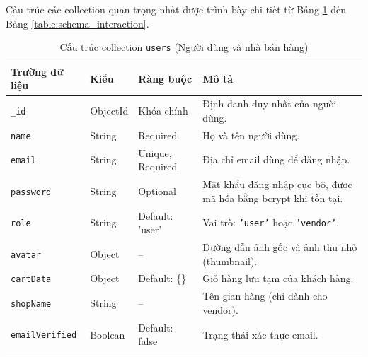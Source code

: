 \documentclass[../DoAn.tex]{subfiles}
\begin{document}
Cấu trúc các collection quan trọng nhất được trình bày chi tiết từ Bảng \ref{table:schema_user} đến Bảng \ref{table:schema_interaction}.

\begin{table}[H]
    \centering
    \caption{Cấu trúc collection \texttt{users} (Người dùng và nhà bán hàng)}
    \label{table:schema_user}
    \small
    \setlength{\tabcolsep}{3pt}
    \begin{tabular}{|>{\raggedright\arraybackslash}p{3.0cm}|>{\raggedright\arraybackslash}p{1.7cm}|>{\raggedright\arraybackslash}p{2.6cm}|>{\raggedright\arraybackslash}p{5.3cm}|}
        \hline
        \textbf{Trường dữ liệu} & \textbf{Kiểu} & \textbf{Ràng buộc} & \textbf{Mô tả} \\ \hline
        \texttt{\_id} & ObjectId & Khóa chính & Định danh duy nhất của người dùng. \\ \hline
        \texttt{name} & String & Required & Họ và tên người dùng. \\ \hline
        \texttt{email} & String & Unique, Required & Địa chỉ email dùng để đăng nhập. \\ \hline
        \texttt{password} & String & Optional & Mật khẩu đăng nhập cục bộ, được mã hóa bằng bcrypt khi tồn tại. \\ \hline
        \texttt{role} & String & Default: 'user' & Vai trò: \texttt{'user'} hoặc \texttt{'vendor'}. \\ \hline
        \texttt{avatar} & Object & -- & Đường dẫn ảnh gốc và ảnh thu nhỏ (thumbnail). \\ \hline
        \texttt{cartData} & Object & Default: \{\} & Giỏ hàng lưu tạm của khách hàng. \\ \hline
        \texttt{shopName} & String & -- & Tên gian hàng (chỉ dành cho vendor). \\ \hline
        \texttt{email}\allowbreak\texttt{Verified} & Boolean & Default: false & Trạng thái xác thực email. \\ \hline
    \end{tabular}
\end{table}
\end{document}
